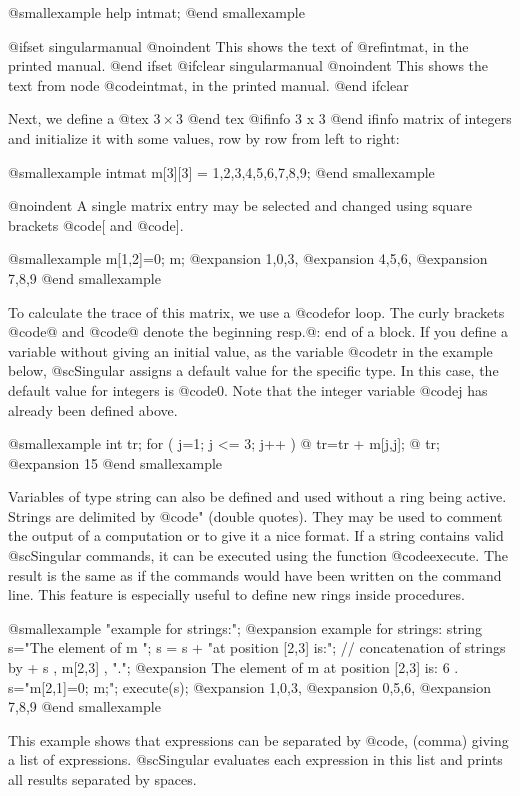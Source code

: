 @smallexample
help intmat;
@end smallexample

@ifset singularmanual
@noindent This shows the text of @ref{intmat}, in the printed manual.
@end ifset
@ifclear singularmanual
@noindent This shows the text from node @code{intmat}, in the printed manual.
@end ifclear

Next, we define a
@tex
$3 \times 3$
@end tex
@ifinfo
3 x 3
@end ifinfo
 matrix of integers and initialize it with some values, row by row
from left to right:

@smallexample
intmat m[3][3] = 1,2,3,4,5,6,7,8,9;
@end smallexample

@noindent A single matrix entry may be selected and changed using
square brackets @code{[} and @code{]}.

@smallexample
m[1,2]=0;
m;
@expansion{} 1,0,3,
@expansion{} 4,5,6,
@expansion{} 7,8,9
@end smallexample

To calculate the trace of this matrix, we use a @code{for} loop. The
curly brackets @code{@{} and @code{@}} denote the beginning resp.@:
end of a block. If you define a variable without giving an initial
value, as the variable @code{tr} in the example below, @sc{Singular}
assigns a default value for the specific type. In this case, the default
value for integers is @code{0}. Note that the integer variable @code{j}
has already been defined above.

@smallexample
int tr;
for ( j=1; j <= 3; j++ ) @{ tr=tr + m[j,j]; @}
tr;
@expansion{} 15
@end smallexample

Variables of type string can also be defined and used without a ring
being active. Strings are delimited by @code{"} (double quotes). They
may be used to comment the output of a computation or to give it a nice
format. If a string contains valid @sc{Singular} commands, it can be
executed using the function @code{execute}. The result is the same as if
the commands would have been written on the command line. This feature
is especially useful to define new rings inside procedures.

@smallexample
"example for strings:";
@expansion{} example for strings:
string s="The element of m ";
s = s + "at position [2,3] is:";  // concatenation of strings by +
s , m[2,3] , ".";
@expansion{} The element of m at position [2,3] is: 6 .
s="m[2,1]=0; m;";
execute(s);
@expansion{} 1,0,3,
@expansion{} 0,5,6,
@expansion{} 7,8,9
@end smallexample

This example shows that expressions can be separated by @code{,} (comma)
giving a list of expressions. @sc{Singular} evaluates each expression in
this list and prints all results separated by spaces.

